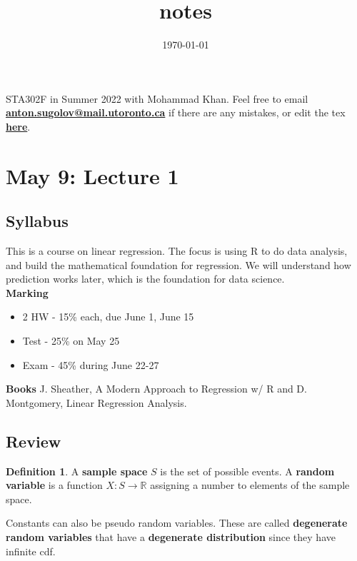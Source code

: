 \documentclass[12pt, a4paper]{article}
\title{{\Course} notes}
\date{\today}
\theoremstyle{definition}
\newtheorem{definition}{Definition}
\newcommand{\R}{\mathbb{R}}                           %
\begin{document}
	
	\maketitle
	
	STA302F in Summer 2022 with Mohammad Khan. Feel free to email  \href{mailto://anton.sugolov@mail.utoronto.ca}{\bf anton.sugolov@mail.utoronto.ca} if there are any mistakes, or edit the tex \href{https://sugolov.github.io/blog/files/sta302.tex}{\bf here}.
	
	\tableofcontents

\newpage
	
	\section{May 9: Lecture 1}
	\subsection{Syllabus}
	
	This is a course on linear regression. The focus is using R to do data analysis, and build the mathematical foundation for regression. We will understand how prediction works later, which is the foundation for data science.\\
	
	{\bf Marking} 
	\begin{itemize}
		\item 2 HW - 15\% each, due June 1, June 15
		\item Test - 25\% on May 25
		\item Exam - 45\% during June 22-27
	\end{itemize}
	
	{\bf Books} J. Sheather, A Modern Approach to Regression w/ R and D. Montgomery, Linear Regression Analysis.
	
	\subsection{Review}
	
	\begin{definition}
		A {\bf sample space} $S$ is the set of possible events. 
		A {\bf random variable} is a function $X \colon S \to \R$ assigning a number to elements of the sample space.
	\end{definition}

	Constants can also be pseudo random variables. These are called {\bf degenerate random variables} that have a {\bf degenerate distribution} since they have infinite cdf.
	
\end{document}
